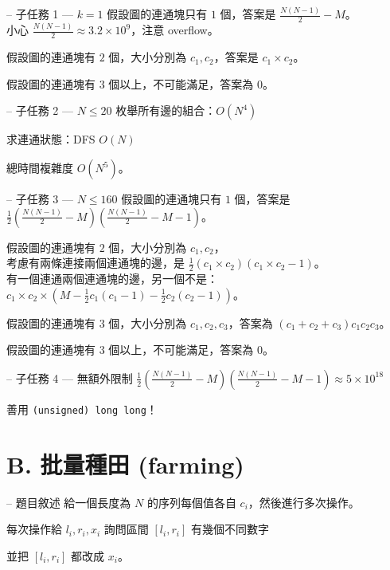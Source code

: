 \documentclass[hyperref,UTF8,notheorems,xcolor={dvipsnames}]{beamer}
\newcommand{\btitle}[1]{{\secname} -- #1}
\theoremstyle{definition}
\begin{document}
\begin{frame}[fragile]{\btitle{子任務 1 --- $k = 1$}}
	假設圖的連通塊只有 $1$ 個，答案是 $\frac{N(N-1)}{2} - M$。\\
	小心 $\frac{N(N-1)}{2} \approx 3.2 \times 10^9$，注意 overflow。
	
	假設圖的連通塊有 $2$ 個，大小分別為 $c_1, c_2$，答案是 $c_1 \times c_2$。

	假設圖的連通塊有 $3$ 個以上，不可能滿足，答案為 $0$。
\end{frame}

\begin{frame}[fragile]{\btitle{子任務 2 --- $N \leq 20$}}
	枚舉所有邊的組合：$O(N^4)$

	求連通狀態：DFS $O(N)$

	總時間複雜度 $O(N^5)$。  
\end{frame}

\begin{frame}[fragile]{\btitle{子任務 3 --- $N \leq 160$}}
	假設圖的連通塊只有 $1$ 個，答案是 $\frac{1}{2}\left(\frac{N(N-1)}{2} - M\right)\left(\frac{N(N-1)}{2} - M - 1\right)$。
	

	假設圖的連通塊有 $2$ 個，大小分別為 $c_1, c_2$，\\
	考慮有兩條連接兩個連通塊的邊，是 $\frac{1}{2}(c_1 \times c_2)(c_1 \times c_2 - 1)$。\\
	有一個連通兩個連通塊的邊，另一個不是：$c_1\times c_2 \times (M - \frac{1}{2}c_1(c_1-1) - \frac{1}{2}c_2(c_2-1))$。  


	假設圖的連通塊有 $3$ 個，大小分別為 $c_1, c_2, c_3$，答案為 $(c_1 + c_2 + c_3)c_1c_2c_3$。  
	

	假設圖的連通塊有 $3$ 個以上，不可能滿足，答案為 $0$。 
\end{frame}

\begin{frame}[fragile]{\btitle{子任務 4 --- 無額外限制}}
	$\frac{1}{2}\left(\frac{N(N-1)}{2} - M\right)\left(\frac{N(N-1)}{2} - M - 1\right) \approx 5 \times 10^{18}$  

	善用 \texttt{(unsigned) long long}！
\end{frame}

\section{B. 批量種田 (farming)}

\begin{frame}[fragile]{\btitle{題目敘述}}
	給一個長度為 $N$ 的序列每個值各自 $c_i$，然後進行多次操作。
	
	每次操作給 $l_i, r_i, x_i$ 詢問區間 $[l_i, r_i]$ 有幾個不同數字

	並把 $[l_i,r_i]$ 都改成 $x_i$。 
\end{frame}
\end{document}
